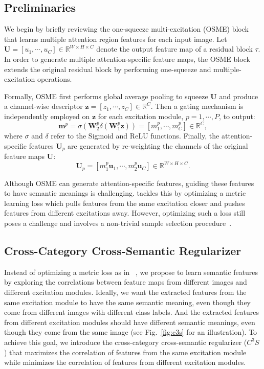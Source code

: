 \documentclass[10pt,twocolumn,letterpaper]{article}
\begin{document}
\subsection{Preliminaries}
\label{sec:pre}
We begin by briefly reviewing the one-squeeze multi-excitation (OSME) block~\cite{mamc18eccv} that learns multiple attention region features for each input image.
Let $\mathbf{U}=[u_1,\cdots,u_C] \in \mathbb{R}^{W\times H\times C}$ denote the output feature map of a residual block $\tau$. 
In order to generate multiple attention-specific feature maps, the OSME block extends the original residual block by performing one-squeeze and multiple-excitation operations.

Formally, OSME first performs global average pooling to squeeze $\mathbf{U}$ and produce a channel-wise descriptor $\mathbf{z}=[z_1,\cdots,z_C] \in \mathbb{R}^{C}$.
Then a gating mechanism is independently employed on $\mathbf{z}$ for each excitation module, $p=1, \cdots, P$, to output: \begin{equation}
\label{eq:osme-mp}
\mathbf{m}^p=\sigma(\mathbf{W}_2^p\delta(\mathbf{W}_1^p\mathbf{z}))=[m_1^p,\cdots,m_C^p]\in\mathbb{R}^C,
\end{equation}
where $\sigma$ and $\delta$ refer to the Sigmoid and ReLU functions. Finally, the attention-specific features $\mathbf{U}_p$ are generated by re-weighting the channels of the original feature maps $\mathbf{U}$:
\begin{equation}
\label{osme-map}
\mathbf{U}_p = [m_1^p\mathbf{u}_1, \cdots, m_2^p\mathbf{u}_C]\in \mathbb{R}^{W\times H\times C}.
\end{equation}

Although OSME can generate attention-specific features, guiding these features to have semantic meanings is challenging. 
{\cite{mamc18eccv}} tackles this by optimizing a metric learning loss which pulls features from the same excitation closer and pushes features from different excitations away. However, optimizing such a loss still poses a challenge and involves a non-trivial sample selection procedure~\cite{wu2017sampling}.


\subsection{Cross-Category Cross-Semantic Regularizer}
\label{sec:fsc}
Instead of optimizing a metric loss as in ~\cite{mamc18eccv}, we propose to learn semantic features by exploring the correlations between feature maps from different images and different excitation modules.
Ideally, we want the extracted features from the same excitation module to have the same semantic meaning, even though they come from different images with different class labels. And the extracted features from different excitation modules should have different semantic meanings, even though they come from the same image (see Fig.~\ref{fig:c3s} for an illustration).
To achieve this goal, we introduce the cross-category cross-semantic regularizer ($C^3S$) that maximizes the correlation of features from the same excitation module while minimizes the correlation of features from different excitation modules.
\end{document}
